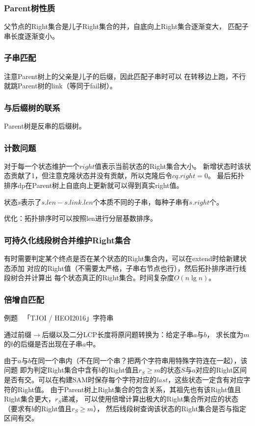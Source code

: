 \subsubsection{Parent树性质}
父节点的Right集合是儿子Right集合的并，自底向上Right集合逐渐变大，
匹配子串长度逐渐变小。
\subsubsection{子串匹配}
注意Parent树上的父亲是儿子的后缀，因此匹配子串时可以
在转移边上跑，不行就跳Parent树的link（等同于fail树）。
\subsubsection{与后缀树的联系}
Parent树是反串的后缀树。
\subsubsection{计数问题}
对于每一个状态维护一个$right$值表示当前状态的Right集合大小。
新增状态时该状态贡献了1，但注意克隆状态并没有贡献，所以克隆后令$cq.right=0$。
最后拓扑排序dp在Parent树上自底向上更新就可以得到真实right值。

状态$s$表示了$s.len-s.link.len$个本质不同的子串，每种子串有$s.right$个。

优化：拓扑排序时可以按照len进行分层基数排序。
\subsubsection{可持久化线段树合并维护Right集合}
有时需要判定某个终点是否在某个状态的Right集合内，可以在extend时给新建状态添加
对应的Right值（不需要太严格，子串右节点也行），然后拓扑排序进行线段树合并计算出
每个状态真正的Right集合。时间复杂度$O(n\lg n)$。
\subsubsection{倍增自匹配}
例题~ 「TJOI / HEOI2016」字符串

通过前缀$\rightarrow$后缀以及二分LCP长度将原问题转换为：给定子串$a$与$b$，
求长度为$m$的$b$的后缀是否出现在子串$a$中。

由于$a$与$b$在同一个串内（不在同一个串？把两个字符串用特殊字符连在一起），该问题
即为判定Right集合中含有$b$的Right值且$r_S\geq m$的状态$S$与$a$对应的Right区间
是否有交。可以在构建SAM时保存每个字符对应的$last$，这些状态一定含有对应字符的Right值。
由于Parent树上Right集合的包含关系，其祖先也有该Right值且Right集合更大，$r_S$递减，
可以使用倍增计算出极大的Right集合所对应的状态（要求有$b$的Right值且$r_S\geq m$），
然后线段树查询该状态的Right集合是否与指定区间有交。

